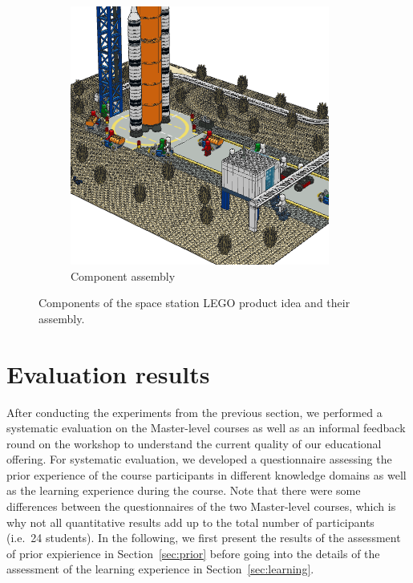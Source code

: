 \documentclass{PDS}
\begin{document}
\begin{figure}[htbp]
    \hfill
    \begin{subfigure}[b]{0.25\textwidth}
        \includegraphics[width=\textwidth]{./figures/space_assembly.png}
        \caption{Component assembly}
    \end{subfigure}
    \caption{Components of the space station LEGO product idea and their assembly.}
    \label{fig:school-sub}
\end{figure}

\section{Evaluation results}
\label{sec:discussion}

After conducting the experiments from the previous section, we performed a systematic evaluation on the Master-level courses as well as an informal feedback round on the workshop to understand the current quality of our educational offering.
For systematic evaluation, we developed a questionnaire assessing the prior experience of the course participants in different knowledge domains as well as the learning experience during the course.
Note that there were some differences between the questionnaires of the two Master-level courses, which is why not all quantitative results add up to the total number of participants (i.e.\ 24 students).
In the following, we first present the results of the assessment of prior expierience in Section~\ref{sec:prior} before going into the details of the assessment of the learning experience in Section~\ref{sec:learning}.
\end{document}
